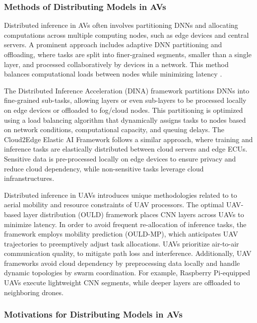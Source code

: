 \documentclass[conference]{IEEEtran}
\begin{document}
\subsubsection{Methods of Distributing Models in AVs}

Distributed inference in AVs often involves partitioning DNNs and allocating computations across multiple computing nodes, such as edge devices and central servers. A prominent approach includes adaptive DNN partitioning and offloading, where tasks are split into finer-grained segments, smaller than a single layer, and processed collaboratively by devices in a network. This method balances computational loads between nodes while minimizing latency \cite{mohammed2020distributed}.

The Distributed Inference Acceleration (DINA) framework \cite{mohammed2020distributed} partitions DNNs into fine-grained sub-tasks, allowing layers or even sub-layers to be processed locally on edge devices or offloaded to fog/cloud nodes. This partitioning is optimized using a load balancing algorithm that dynamically assigns tasks to nodes based on network conditions, computational capacity, and queuing delays. The Cloud2Edge Elastic AI Framework \cite{grigorescu2020cloud2edge} follows a similar approach, where training and inference tasks are elastically distributed between cloud servers and edge ECUs. Sensitive data is pre-processed locally on edge devices to ensure privacy and reduce cloud dependency, while non-sensitive tasks leverage cloud infranstructures. 

Distributed inference in UAVs introduces unique methodologies related to to aerial mobility and resource constraints of UAV processors. The optimal UAV-based layer distribution (OULD) framework \cite{jouhari2021distributed} places CNN layers across UAVs to minimize latency. In order to avoid frequent re-allocation of inference tasks, the framework employs mobility prediction (OULD-MP), which anticipates UAV trajectories to preemptively adjust task allocations. UAVs prioritize air-to-air communication quality, to mitigate path loss and interference. Additionally, UAV frameworks avoid cloud dependency by preprocessing data locally and handle dynamic topologies by swarm coordination. For example, Raspberry Pi-equipped UAVs execute lightweight CNN segments, while deeper layers are offloaded to neighboring drones.


\subsubsection{Motivations for Distributing Models in AVs}
\end{document}
